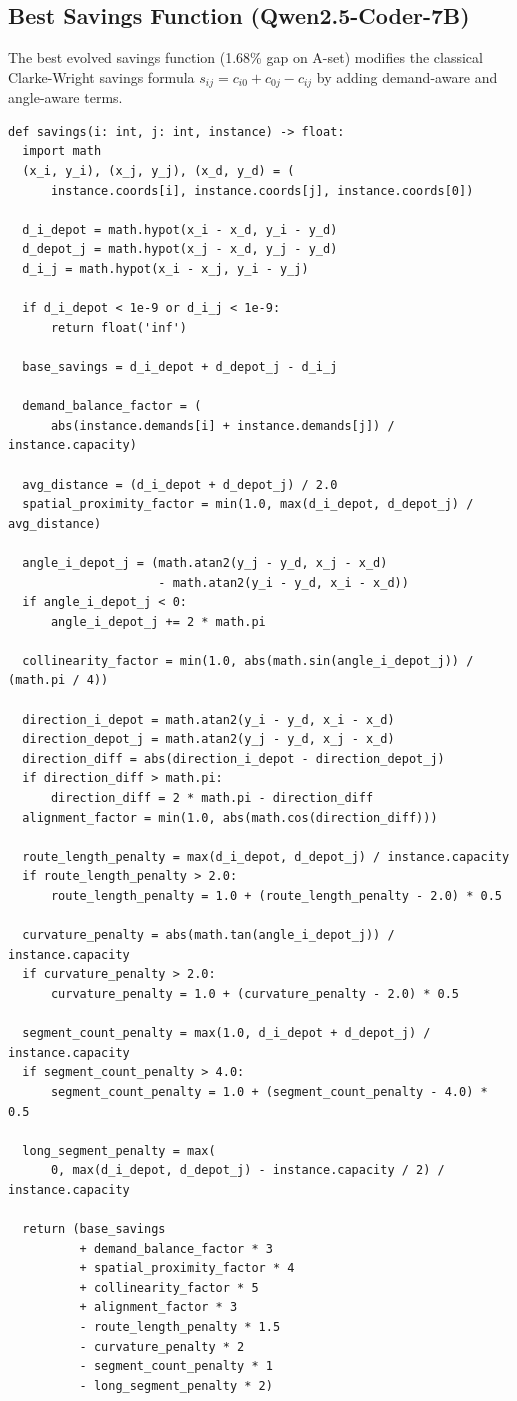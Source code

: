 \documentclass{article}
\begin{document}
\subsection{Best Savings Function (Qwen2.5-Coder-7B)}

The best evolved savings function (1.68\% gap on A-set) modifies the classical Clarke-Wright savings formula $s_{ij} = c_{i0} + c_{0j} - c_{ij}$ by adding demand-aware and angle-aware terms.

\begin{lstlisting}
def savings(i: int, j: int, instance) -> float:
  import math
  (x_i, y_i), (x_j, y_j), (x_d, y_d) = (
      instance.coords[i], instance.coords[j], instance.coords[0])

  d_i_depot = math.hypot(x_i - x_d, y_i - y_d)
  d_depot_j = math.hypot(x_j - x_d, y_j - y_d)
  d_i_j = math.hypot(x_i - x_j, y_i - y_j)

  if d_i_depot < 1e-9 or d_i_j < 1e-9:
      return float('inf')

  base_savings = d_i_depot + d_depot_j - d_i_j

  demand_balance_factor = (
      abs(instance.demands[i] + instance.demands[j]) / instance.capacity)

  avg_distance = (d_i_depot + d_depot_j) / 2.0
  spatial_proximity_factor = min(1.0, max(d_i_depot, d_depot_j) / avg_distance)

  angle_i_depot_j = (math.atan2(y_j - y_d, x_j - x_d)
                     - math.atan2(y_i - y_d, x_i - x_d))
  if angle_i_depot_j < 0:
      angle_i_depot_j += 2 * math.pi

  collinearity_factor = min(1.0, abs(math.sin(angle_i_depot_j)) / (math.pi / 4))

  direction_i_depot = math.atan2(y_i - y_d, x_i - x_d)
  direction_depot_j = math.atan2(y_j - y_d, x_j - x_d)
  direction_diff = abs(direction_i_depot - direction_depot_j)
  if direction_diff > math.pi:
      direction_diff = 2 * math.pi - direction_diff
  alignment_factor = min(1.0, abs(math.cos(direction_diff)))

  route_length_penalty = max(d_i_depot, d_depot_j) / instance.capacity
  if route_length_penalty > 2.0:
      route_length_penalty = 1.0 + (route_length_penalty - 2.0) * 0.5

  curvature_penalty = abs(math.tan(angle_i_depot_j)) / instance.capacity
  if curvature_penalty > 2.0:
      curvature_penalty = 1.0 + (curvature_penalty - 2.0) * 0.5

  segment_count_penalty = max(1.0, d_i_depot + d_depot_j) / instance.capacity
  if segment_count_penalty > 4.0:
      segment_count_penalty = 1.0 + (segment_count_penalty - 4.0) * 0.5

  long_segment_penalty = max(
      0, max(d_i_depot, d_depot_j) - instance.capacity / 2) / instance.capacity

  return (base_savings
          + demand_balance_factor * 3
          + spatial_proximity_factor * 4
          + collinearity_factor * 5
          + alignment_factor * 3
          - route_length_penalty * 1.5
          - curvature_penalty * 2
          - segment_count_penalty * 1
          - long_segment_penalty * 2)
\end{lstlisting}
\end{document}

